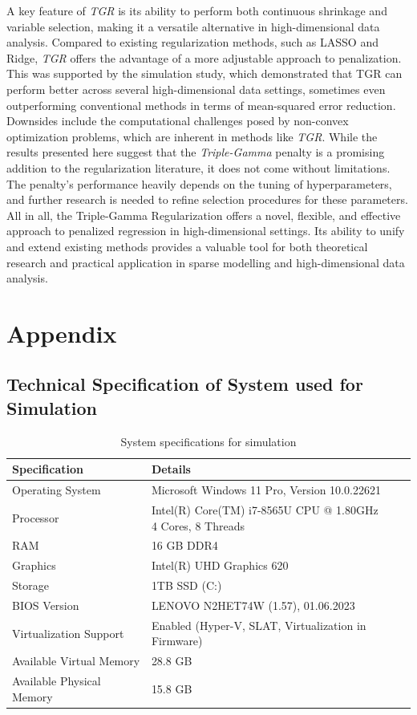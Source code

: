 \documentclass[12pt,a4paper]{article}
\begin{document}
A key feature of \textit{TGR} is its ability to perform both continuous shrinkage and variable selection, making it a versatile alternative in high-dimensional data analysis. Compared to existing regularization methods, such as LASSO and Ridge, \textit{TGR} offers the advantage of a more adjustable approach to penalization. This was supported by the simulation study, which demonstrated that TGR can perform better across several high-dimensional data settings, sometimes even outperforming conventional methods in terms of mean-squared error reduction. Downsides include the computational challenges posed by non-convex optimization problems, which are inherent in methods like \textit{TGR}. While the results presented here suggest that the \textit{Triple-Gamma} penalty is a promising addition to the regularization literature, it does not come without limitations. The penalty’s performance heavily depends on the tuning of hyperparameters, and further research is needed to refine selection procedures for these parameters.\\

All in all, the Triple-Gamma Regularization offers a novel, flexible, and effective approach to penalized regression in high-dimensional settings. Its ability to unify and extend existing methods provides a valuable tool for both theoretical research and practical application in sparse modelling and high-dimensional data analysis. 

\newpage

\section{Appendix}
\subsection{Technical Specification of System used for Simulation}

\begin{table}[H]
\centering
\begin{tabular}{ll}
\toprule
\textbf{Specification} & \textbf{Details} \\
\midrule
Operating System       & Microsoft Windows 11 Pro, Version 10.0.22621 \\
Processor              & \makecell[l]{Intel(R) Core(TM) i7-8565U CPU @ 1.80GHz\\4 Cores, 8 Threads} \\
RAM                    & 16 GB DDR4 \\
Graphics               & Intel(R) UHD Graphics 620 \\
Storage                & 1TB SSD (C:) \\
BIOS Version           & LENOVO N2HET74W (1.57), 01.06.2023 \\
Virtualization Support & Enabled (Hyper-V, SLAT, Virtualization in Firmware) \\
Available Virtual Memory & 28.8 GB \\
Available Physical Memory & 15.8 GB \\
\bottomrule
\end{tabular}
\caption{System specifications for simulation}
\end{table}
\end{document}
